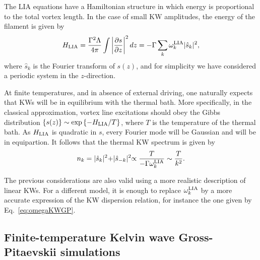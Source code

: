 \documentclass[sn-mathphys]{sn-jnl}%
\begin{document}
The LIA equations have a Hamiltonian structure in which energy is proportional to the total vortex length. In the case of small KW amplitudes, the energy of the filament is given by
 \begin{equation}
     H_{\rm LIA}=\frac{\Gamma^2 \Lambda}{4\pi} \int \left\lvert\frac{\partial s}{\partial z}\right\lvert^2 dz= -\Gamma\sum_k \omega_k^{\rm LIA} \lvert \hat{s}_k\lvert^2,
 \end{equation}
where $\hat{s}_k$ is the Fourier transform of $s(z)$, and for simplicity we have considered a periodic system in the $z$-direction.

At finite temperatures, and in absence of external driving, one naturally expects that KWs will be in equilibrium with the thermal bath. More specifically, in the classical approximation, vortex line excitations should obey the Gibbs distribution $\{s(z)\}\sim \exp{\{-H_{\rm LIA}/T\}}$, where $T$ is the temperature of the thermal bath. As $H_{\rm LIA}$ is quadratic in $s$, every Fourier mode will be Gaussian and will be in equipartion. It follows that the thermal KW spectrum is given by 
\begin{equation}\label{eq:thermalKWspectrum}
    n_k=\lvert \hat{s}_k\lvert^2+\lvert \hat{s}_{-k}\lvert^2\propto \frac{T}{-\Gamma\omega^{\rm LIA}_k}\sim\frac{T}{k^2}.
\end{equation}

The previous considerations are also valid using a more realistic description of linear KWs. For a different model, it is enough to replace ${\omega_k^{\rm LIA}}$ by a more accurate expression of the KW dispersion relation, for instance the one given by Eq.~\eqref{eq:omegaKWGP}.

\subsection{Finite-temperature Kelvin wave Gross-Pitaevskii simulations}\label{subsec:eqTGPKW}
\end{document}
